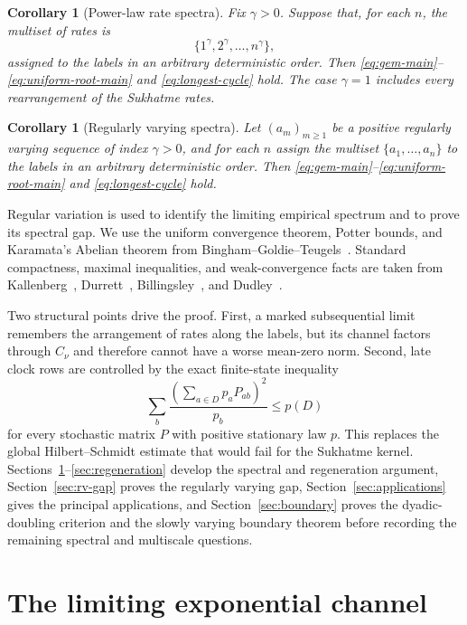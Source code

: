 \documentclass[11pt]{article}
\newtheorem{corollary}[theorem]{Corollary}
\theoremstyle{definition}
\theoremstyle{remark}
\begin{document}
\begin{corollary}[Power-law rate spectra]
\label{cor:power-law-spectra}
Fix $\gamma>0$.  Suppose that, for each $n$, the multiset of rates is
\[
  \{1^\gamma,2^\gamma,\ldots,n^\gamma\},
\]
assigned to the labels in an arbitrary deterministic order.  Then
\eqref{eq:gem-main}--\eqref{eq:uniform-root-main} and
\eqref{eq:longest-cycle} hold.  The case $\gamma=1$ includes every
rearrangement of the Sukhatme rates.
\end{corollary}

\begin{corollary}[Regularly varying spectra]
\label{cor:regularly-varying}
Let $(a_m)_{m\ge1}$ be a positive regularly varying sequence of index
$\gamma>0$, and for each $n$ assign the multiset
$\{a_1,\ldots,a_n\}$ to the labels in an arbitrary deterministic order.
Then \eqref{eq:gem-main}--\eqref{eq:uniform-root-main} and
\eqref{eq:longest-cycle} hold.
\end{corollary}

Regular variation is used to identify the limiting empirical spectrum and to
prove its spectral gap.  We use the uniform convergence theorem, Potter bounds,
and Karamata's Abelian theorem from
Bingham--Goldie--Teugels~\cite{BGT1987}.  Standard compactness, maximal
inequalities, and weak-convergence facts are taken from
Kallenberg~\cite{Kallenberg2002}, Durrett~\cite{Durrett2019},
Billingsley~\cite{Billingsley1999}, and Dudley~\cite{Dudley2002}.

Two structural points drive the proof.  First, a marked subsequential limit
remembers the arrangement of rates along the labels, but its channel factors
through $C_\nu$ and therefore cannot have a worse mean-zero norm.  Second, late
clock rows are controlled by the exact finite-state inequality
\[
  \sum_b\frac{(\sum_{a\in D}p_aP_{ab})^2}{p_b}\le p(D)
\]
for every stochastic matrix $P$ with positive stationary law $p$.  This replaces the
global Hilbert--Schmidt estimate that would fail for the Sukhatme kernel.
Sections~\ref{sec:channel}--\ref{sec:regeneration} develop the spectral and
regeneration argument, Section~\ref{sec:rv-gap} proves the regularly varying
gap, Section~\ref{sec:applications} gives the principal applications, and
Section~\ref{sec:boundary} proves the dyadic-doubling criterion and the slowly
varying boundary theorem before recording the remaining spectral and multiscale
questions.

\section{The limiting exponential channel}
\label{sec:channel}
\end{document}
